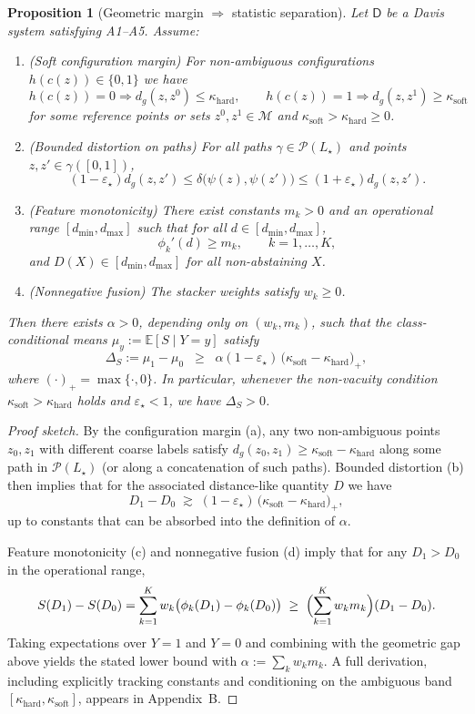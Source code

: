 \documentclass[11pt]{article}
\newtheorem{proposition}{Proposition}
\begin{document}
\begin{proposition}[Geometric margin $\Rightarrow$ statistic separation]
\label{prop:geom-to-stat}
Let $\mathsf{D}$ be a Davis system satisfying A1–A5. Assume:
\begin{enumerate}[label=(\alph*), leftmargin=2em]
  \item (Soft configuration margin) For non-ambiguous configurations
    $h(c(z)) \in \{0,1\}$ we have
    \[
    h(c(z)) = 0 \Rightarrow d_g(z,z^0) \le \kappa_{\mathrm{hard}},\qquad
    h(c(z)) = 1 \Rightarrow d_g(z,z^1) \ge \kappa_{\mathrm{soft}}
    \]
    for some reference points or sets $z^0,z^1 \in \mathcal{M}$ and
    $\kappa_{\mathrm{soft}} > \kappa_{\mathrm{hard}} \ge 0$.
  \item (Bounded distortion on paths) For all paths $\gamma \in \mathcal{P}(L_\star)$ and
    points $z,z' \in \gamma([0,1])$,
    \[
    (1-\varepsilon_\star) d_g(z,z') \le \delta\!\bigl(\psi(z),\psi(z')\bigr)
    \le (1+\varepsilon_\star) d_g(z,z').
    \]
  \item (Feature monotonicity) There exist constants $m_k > 0$ and an operational range
    $[d_{\min}, d_{\max}]$ such that for all $d \in [d_{\min}, d_{\max}]$,
    \[
    \phi_k'(d) \ge m_k,\qquad k=1,\dots,K,
    \]
    and $D(X) \in [d_{\min}, d_{\max}]$ for all non-abstaining $X$.
  \item (Nonnegative fusion) The stacker weights satisfy $w_k \ge 0$.
\end{enumerate}
Then there exists $\alpha > 0$, depending only on $(w_k, m_k)$, such that the class-conditional
means $\mu_y := \mathbb{E}[S \mid Y=y]$ satisfy
\[
\Delta_S := \mu_1 - \mu_0 \;\;\ge\;\; \alpha (1-\varepsilon_\star)\,
\bigl(\kappa_{\mathrm{soft}} - \kappa_{\mathrm{hard}}\bigr)_+,
\]
where $(\cdot)_+ = \max\{\cdot,0\}$. In particular, whenever the non-vacuity condition
$\kappa_{\mathrm{soft}} > \kappa_{\mathrm{hard}}$ holds and $\varepsilon_\star < 1$, we have
$\Delta_S > 0$.
\end{proposition}

\begin{proof}[Proof sketch]
By the configuration margin (a), any two non-ambiguous points $z_0,z_1$ with different coarse
labels satisfy $d_g(z_0,z_1) \ge \kappa_{\mathrm{soft}} - \kappa_{\mathrm{hard}}$ along some path in
$\mathcal{P}(L_\star)$ (or along a concatenation of such paths). Bounded distortion (b) then implies
that for the associated distance-like quantity $D$ we have
\[
D_1 - D_0 \;\gtrsim\; (1-\varepsilon_\star)\,
\bigl(\kappa_{\mathrm{soft}} - \kappa_{\mathrm{hard}}\bigr)_+,
\]
up to constants that can be absorbed into the definition of $\alpha$.

Feature monotonicity (c) and nonnegative fusion (d) imply that for any $D_1 > D_0$ in the
operational range,
\[
S(D_1) - S(D_0) = \sum_{k=1}^K w_k\bigl(\phi_k(D_1)-\phi_k(D_0)\bigr)
\;\ge\; \Bigl(\sum_{k=1}^K w_k m_k \Bigr) (D_1 - D_0).
\]
Taking expectations over $Y=1$ and $Y=0$ and combining with the geometric gap above yields
the stated lower bound with $\alpha := \sum_k w_k m_k$. A full derivation, including explicitly
tracking constants and conditioning on the ambiguous band $[\kappa_{\mathrm{hard}},\kappa_{\mathrm{soft}}]$,
appears in Appendix~B.
\end{proof}
\end{document}
